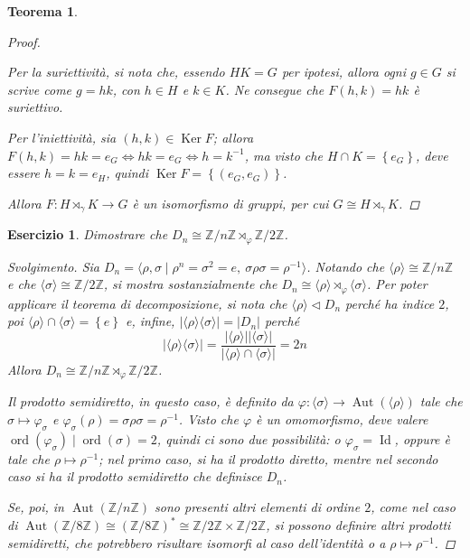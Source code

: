 \documentclass[11pt]{scrartcl}
\theoremstyle{style1}
\newtheorem{teorema}{Teorema}[section]
\newtheorem{esercizio}{Esercizio}[section]
\newenvironment{svolgimento}{\renewcommand\qedsymbol{$\blacksquare$}\begin{proof}[Svolgimento]}{\end{proof}}
\numberwithin{equation}{subsection}
\begin{document}
\begin{teorema}
\begin{proof}
\begin{itemize}
				Per la suriettivit\`a, si nota che, essendo $HK = G$ per ipotesi, allora ogni $g \in G$ si scrive come $g = hk$, con $h \in H$ e $k \in K$.
				Ne consegue che $F(h,k) = hk$ \`e suriettivo.

				Per l'iniettivit\`a, sia $(h,k) \in \operatorname{Ker} F$; allora $F(h,k) = hk = e_G \iff hk = e_G \iff h = k^{-1}$, ma visto che $H\cap K = \left\{ e_G \right\} $, deve essere $h=k = e_H$, quindi $\operatorname{Ker} F = \left\{ (e_G,e_G) \right\} $.
		\end{itemize}
	Allora $F: H\rtimes _\gamma K \to G$ \`e un isomorfismo di gruppi, per cui $G \cong H \rtimes _\gamma K$.
	\end{proof}
\end{teorema}
\begin{esercizio}
Dimostrare che $D_n \cong \mathbb{Z}/ n\mathbb{Z}\rtimes _\varphi \mathbb{Z}/ 2\mathbb{Z}$.
\begin{svolgimento}
	Sia $D_n = \langle \rho , \sigma   \mid \rho ^n = \sigma ^2 = e, \ \sigma \rho \sigma = \rho ^{-1} \rangle$. 
	Notando che $\langle \rho  \rangle\cong \mathbb{Z} / n \mathbb{Z}$ e che $\langle \sigma  \rangle\cong \mathbb{Z} / 2 \mathbb{Z}$, si mostra sostanzialmente che $D_n\cong \langle \rho  \rangle\rtimes_\varphi  \langle \sigma  \rangle$.
	Per poter applicare il teorema di decomposizione, si nota che $\langle \rho  \rangle \lhd D_n$ perch\'e ha indice $2$, poi $\langle \rho  \rangle\cap \langle \sigma  \rangle = \left\{ e \right\} $ e, infine, $\lvert \langle \rho  \rangle\langle \sigma  \rangle \rvert = \lvert D_n \rvert $ perch\'e
\[
\lvert \langle \rho  \rangle\langle \sigma  \rangle \rvert = \frac{\lvert \langle \rho  \rangle \rvert \lvert \langle \sigma  \rangle \rvert }{\lvert \langle \rho  \rangle\cap\langle \sigma  \rangle \rvert } = 2n
\] 
Allora $D_n \cong \mathbb{Z}/n\mathbb{Z}\rtimes _\varphi \mathbb{Z}/2\mathbb{Z}$.

	Il prodotto semidiretto, in questo caso, \`e definito da $\varphi : \langle \sigma  \rangle\to \operatorname{Aut} (\langle \rho  \rangle)$ tale che $\sigma \longmapsto \varphi _\sigma  $ e $\varphi _\sigma (\rho ) = \sigma \rho \sigma = \rho ^{-1}$.
	Visto che $\varphi$ \`e un omomorfismo, deve valere $\operatorname{ord}(\varphi _\sigma )  \mid \operatorname{ord}(\sigma  ) =2$, quindi ci sono due possibilit\`a: o $\varphi _\sigma  = \operatorname{Id} $, oppure \`e tale che $\rho \longmapsto \rho ^{-1}$; nel primo caso, si ha il prodotto diretto, mentre nel secondo caso si ha il prodotto semidiretto che definisce $D_n$.

	Se, poi, in $\operatorname{Aut} (\mathbb{Z}/n\mathbb{Z})$ sono presenti altri elementi di ordine $2$, come nel caso di $\operatorname{Aut} (\mathbb{Z}/8\mathbb{Z})\cong (\mathbb{Z}/8\mathbb{Z})^* \cong \mathbb{Z}/2\mathbb{Z}\times \mathbb{Z}/2\mathbb{Z}$, si possono definire altri prodotti semidiretti, che potrebbero risultare isomorfi al caso dell'identit\`a o a $\rho \longmapsto \rho ^{-1}$.
\end{svolgimento}
\end{esercizio}
\end{document}
